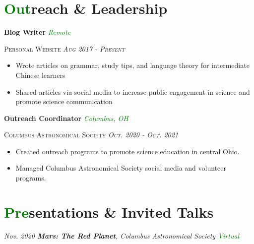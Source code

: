 \documentclass[11pt]{article}
\begin{document}
\section*{\textcolor{green}{Out}reach \& Leadership}

\noindent \textbf{Blog Writer} \hfill \textcolor{green}{\textit{Remote}}

\noindent \textsc{Personal Website \hfill {\textit{Aug 2017 - Present}}}
\vspace{-2mm}
\begin{itemize}
    \setlength{\itemsep}{0cm}
    \setlength{\parskip}{0cm}
    \addtolength{\leftskip}{-5mm}
    \item Wrote articles on grammar, study tips, and language theory for intermediate Chinese learners
    \item Shared articles via social media to increase public engagement in science and promote
    science communication
\end{itemize}

\noindent \textbf{Outreach Coordinator} \hfill {\textit{\textcolor{green}{Columbus, OH}}}

\noindent \textsc{Columbus Astronomical Society \hfill {\textit{Oct. 2020 - Oct. 2021}}}
\vspace{-2mm}
\begin{itemize}
    \setlength{\itemsep}{0cm}
    \setlength{\parskip}{0cm}
    \addtolength{\leftskip}{-5mm}
    \item Created outreach programs to promote science education in central Ohio.
    \item Managed Columbus Astronomical Society social media and volunteer programs. 
\end{itemize}



\section*{\textcolor{green}{Pre}sentations \& Invited Talks}

\textit{Nov. 2020 \textbf{Mars: The Red Planet}, Columbus Astronomical Society \hfill \textcolor{green}{Virtual}}
\end{document}
